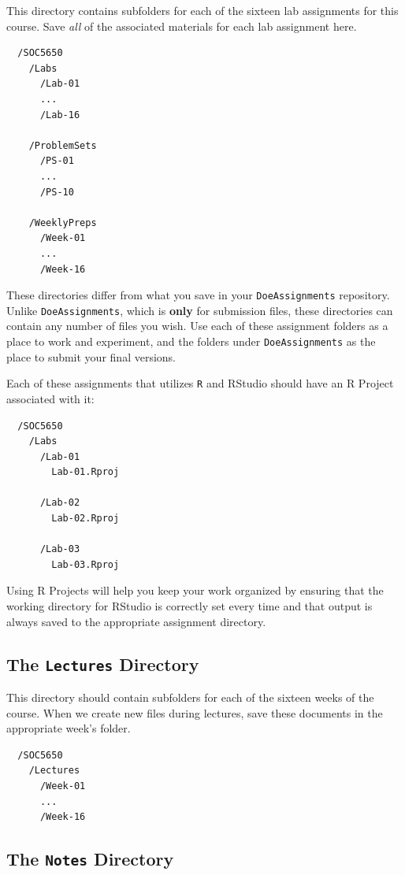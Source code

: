 \documentclass[]{book}
\theoremstyle{definition}
\theoremstyle{definition}
\theoremstyle{definition}
\theoremstyle{remark}
\begin{document}
This directory contains subfolders for each of the sixteen lab
assignments for this course. Save \emph{all} of the associated materials
for each lab assignment here.

\begin{verbatim}
  /SOC5650
    /Labs
      /Lab-01
      ...
      /Lab-16
      
    /ProblemSets
      /PS-01
      ...
      /PS-10
      
    /WeeklyPreps
      /Week-01
      ...
      /Week-16
\end{verbatim}

These directories differ from what you save in your
\texttt{DoeAssignments} repository. Unlike \texttt{DoeAssignments},
which is \textbf{only} for submission files, these directories can
contain any number of files you wish. Use each of these assignment
folders as a place to work and experiment, and the folders under
\texttt{DoeAssignments} as the place to submit your final versions.

Each of these assignments that utilizes \texttt{R} and RStudio should
have an R Project associated with it:

\begin{verbatim}
  /SOC5650
    /Labs
      /Lab-01
        Lab-01.Rproj
        
      /Lab-02
        Lab-02.Rproj
        
      /Lab-03
        Lab-03.Rproj
\end{verbatim}

Using R Projects will help you keep your work organized by ensuring that
the working directory for RStudio is correctly set every time and that
output is always saved to the appropriate assignment directory.

\subsection{\texorpdfstring{The \texttt{Lectures}
Directory}{The Lectures Directory}}\label{the-lectures-directory}

This directory should contain subfolders for each of the sixteen weeks
of the course. When we create new files during lectures, save these
documents in the appropriate week's folder.

\begin{verbatim}
  /SOC5650
    /Lectures
      /Week-01
      ...
      /Week-16
\end{verbatim}

\subsection{\texorpdfstring{The \texttt{Notes}
Directory}{The Notes Directory}}\label{the-notes-directory}
\end{document}
